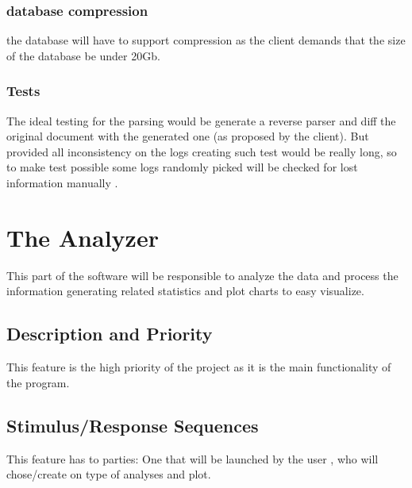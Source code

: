 \documentclass{scrreprt}
\begin{document}
\subsubsection{database compression}
the database will have to support compression as the client demands that the
size of the database be under 20Gb.


\subsubsection{Tests}

The ideal testing for the parsing would be generate a reverse parser and diff
the original document with the generated one (as proposed by the client).
But provided all inconsistency on the logs creating such test would be really
long, so to make test possible some logs randomly picked will be checked for
lost information manually .


\section{The Analyzer}
This part of the software will be responsible to analyze the data and process
the information generating related statistics and plot charts to easy visualize.


\subsection{Description and Priority}
This feature is the high priority of the  project as it is the main
functionality of the program.

\subsection{Stimulus/Response Sequences}
This feature has to parties:
One that will be launched by the user , who will chose/create on type of
analyses and plot.
\end{document}
